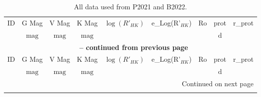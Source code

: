 \begin{longtable}{ccccccccc}
  \caption{All data used from P2021 and B2022.}\label{tab:dataset} \\
  \hline
  ID & G Mag & V Mag & K Mag & $\log(R'_{HK})$ & e\_Log(R'$_{HK}$) & Ro & prot & r\_prot \\
   & $\mathrm{mag}$ & $\mathrm{mag}$ & $\mathrm{mag}$ &  &  &  & $\mathrm{d}$ & \\
  \hline
  \endfirsthead  %

  \multicolumn{9}{c}{{\bfseries \tablename\ \thetable{} -- continued from previous page}} \\
  \hline
  ID & G Mag & V Mag & K Mag & $\log(R'_{HK})$ & e\_Log(R'$_{HK}$) & Ro & prot & r\_prot \\
   & $\mathrm{mag}$ & $\mathrm{mag}$ & $\mathrm{mag}$ &  &  &  & $\mathrm{d}$ & \\
  \hline
  \endhead  %

  \hline
  \multicolumn{9}{r}{{Continued on next page}} \\ 
  \endfoot  %


\end{longtable}
